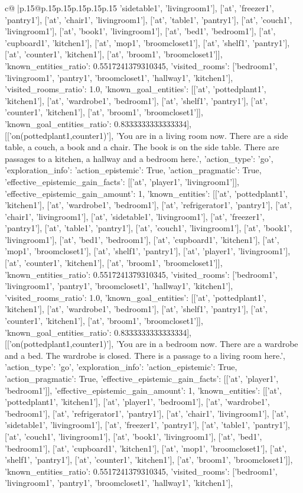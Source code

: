 \documentclass{article}
\begin{document}
{\begin{supertabular}{c@{$\;$}|p{.15\linewidth}@{}p{.15\linewidth}p{.15\linewidth}p{.15\linewidth}p{.15\linewidth}p{.15\linewidth}}
{{{'sidetable1', 'livingroom1'], ['at', 'freezer1', 'pantry1'], ['at', 'chair1', 'livingroom1'], ['at', 'table1', 'pantry1'], ['at', 'couch1', 'livingroom1'], ['at', 'book1', 'livingroom1'], ['at', 'bed1', 'bedroom1'], ['at', 'cupboard1', 'kitchen1'], ['at', 'mop1', 'broomcloset1'], ['at', 'shelf1', 'pantry1'], ['at', 'counter1', 'kitchen1'], ['at', 'broom1', 'broomcloset1']], 'known_entities_ratio': 0.5517241379310345, 'visited_rooms': ['bedroom1', 'livingroom1', 'pantry1', 'broomcloset1', 'hallway1', 'kitchen1'], 'visited_rooms_ratio': 1.0, 'known_goal_entities': [['at', 'pottedplant1', 'kitchen1'], ['at', 'wardrobe1', 'bedroom1'], ['at', 'shelf1', 'pantry1'], ['at', 'counter1', 'kitchen1'], ['at', 'broom1', 'broomcloset1']], 'known_goal_entities_ratio': 0.8333333333333334}}], [['on(pottedplant1,counter1)'], 'You are in a living room now. There are a side table, a couch, a book and a chair. The book is on the side table. There are passages to a kitchen, a hallway and a bedroom here.', {'action_type': 'go', 'exploration_info': {'action_epistemic': True, 'action_pragmatic': True, 'effective_epistemic_gain_facts': [['at', 'player1', 'livingroom1']], 'effective_epistemic_gain_amount': 1, 'known_entities': [['at', 'pottedplant1', 'kitchen1'], ['at', 'wardrobe1', 'bedroom1'], ['at', 'refrigerator1', 'pantry1'], ['at', 'chair1', 'livingroom1'], ['at', 'sidetable1', 'livingroom1'], ['at', 'freezer1', 'pantry1'], ['at', 'table1', 'pantry1'], ['at', 'couch1', 'livingroom1'], ['at', 'book1', 'livingroom1'], ['at', 'bed1', 'bedroom1'], ['at', 'cupboard1', 'kitchen1'], ['at', 'mop1', 'broomcloset1'], ['at', 'shelf1', 'pantry1'], ['at', 'player1', 'livingroom1'], ['at', 'counter1', 'kitchen1'], ['at', 'broom1', 'broomcloset1']], 'known_entities_ratio': 0.5517241379310345, 'visited_rooms': ['bedroom1', 'livingroom1', 'pantry1', 'broomcloset1', 'hallway1', 'kitchen1'], 'visited_rooms_ratio': 1.0, 'known_goal_entities': [['at', 'pottedplant1', 'kitchen1'], ['at', 'wardrobe1', 'bedroom1'], ['at', 'shelf1', 'pantry1'], ['at', 'counter1', 'kitchen1'], ['at', 'broom1', 'broomcloset1']], 'known_goal_entities_ratio': 0.8333333333333334}}], [['on(pottedplant1,counter1)'], 'You are in a bedroom now. There are a wardrobe and a bed. The wardrobe is closed. There is a passage to a living room here.', {'action_type': 'go', 'exploration_info': {'action_epistemic': True, 'action_pragmatic': True, 'effective_epistemic_gain_facts': [['at', 'player1', 'bedroom1']], 'effective_epistemic_gain_amount': 1, 'known_entities': [['at', 'pottedplant1', 'kitchen1'], ['at', 'player1', 'bedroom1'], ['at', 'wardrobe1', 'bedroom1'], ['at', 'refrigerator1', 'pantry1'], ['at', 'chair1', 'livingroom1'], ['at', 'sidetable1', 'livingroom1'], ['at', 'freezer1', 'pantry1'], ['at', 'table1', 'pantry1'], ['at', 'couch1', 'livingroom1'], ['at', 'book1', 'livingroom1'], ['at', 'bed1', 'bedroom1'], ['at', 'cupboard1', 'kitchen1'], ['at', 'mop1', 'broomcloset1'], ['at', 'shelf1', 'pantry1'], ['at', 'counter1', 'kitchen1'], ['at', 'broom1', 'broomcloset1']], 'known_entities_ratio': 0.5517241379310345, 'visited_rooms': ['bedroom1', 'livingroom1', 'pantry1', 'broomcloset1', 'hallway1', 'kitchen1'], }}}
\end{supertabular}}
\end{document}
